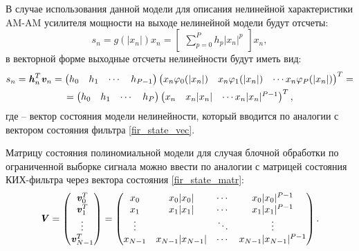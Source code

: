 В случае использования данной модели для описания нелинейной характеристики AM-AM \cite{dpd_models} усилителя мощности на выходе нелинейной модели будут отсчеты:
\begin{equation}
	s_n=g(|x_n|)x_n=\begin{bmatrix}
		\displaystyle\sum_{p=0}^{P}h_p|x_n|^p
	\end{bmatrix}x_n,
	\label{fir_input_polynom_scalar}
\end{equation}
в векторной форме выходные отсчеты нелинейности будут иметь вид:
\begin{multline}
	s_n=\textbf{\textit{h}}_n^T\textbf{\textit{v}}_n=
	\begin{pmatrix}
		h_0 & h_1 & \cdots & h_{P-1}
	\end{pmatrix}
	\begin{pmatrix}
		x_n\varphi_0(|x_n|) &
		x_n\varphi_1(|x_n|) &
		\cdots
		x_n\varphi_P(|x_n|)
	\end{pmatrix}^T=\\
	=\begin{pmatrix}
		h_0 & h_1 & \cdots & h_P
	\end{pmatrix}
	\begin{pmatrix}
		x_n &
		x_n|x_n| &
		\cdots
		x_n|x_n|^{P-1}
	\end{pmatrix}^T
	\label{polynom_model_vect},
\end{multline}
где  -- вектор состояния модели нелинейности, который вводится по аналогии с вектором состояния фильтра \eqref{fir_state_vec}.

Матрицу состояния полиномиальной модели для случая блочной обработки по ограниченной выборке сигнала можно ввести по аналогии с матрицей состояния КИХ-фильтра через вектора состояния \eqref{fir_state_matr}:
\begin{equation}
	\textbf{\textit{V}}=
	\begin{pmatrix}
		\textbf{\textit{v}}_{0}^{T}\\
		\textbf{\textit{v}}_{1}^{T}\\
		\vdots\\
		\textbf{\textit{v}}_{N-1}^{T}
	\end{pmatrix}=
	\begin{pmatrix}
		x_0 &
		x_0|x_0| &
		\cdots & 
		x_0|x_0|^{P-1}\\
		x_1 &
		x_1|x_1| &
		\cdots & 
		x_1|x_1|^{P-1}\\
		\vdots & & \ddots & \vdots\\
		x_{N-1} &
		x_{N-1}|x_{N-1}| &
		\cdots & 
		x_{N-1}|x_{N-1}|^{P-1}
	\end{pmatrix}.
	\label{state_matr_polinom}
\end{equation}


